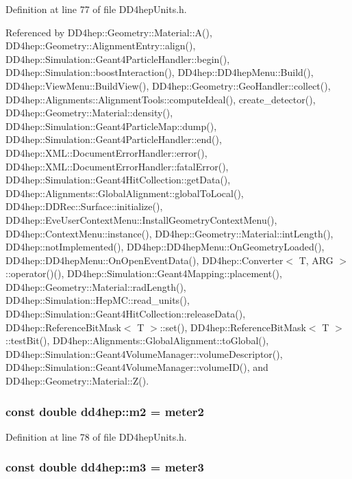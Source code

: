 Definition at line 77 of file DD4hepUnits.h.

Referenced by DD4hep::Geometry::Material::A(), DD4hep::Geometry::AlignmentEntry::align(), DD4hep::Simulation::Geant4ParticleHandler::begin(), DD4hep::Simulation::boostInteraction(), DD4hep::DD4hepMenu::Build(), DD4hep::ViewMenu::BuildView(), DD4hep::Geometry::GeoHandler::collect(), DD4hep::Alignments::AlignmentTools::computeIdeal(), create\_\-detector(), DD4hep::Geometry::Material::density(), DD4hep::Simulation::Geant4ParticleMap::dump(), DD4hep::Simulation::Geant4ParticleHandler::end(), DD4hep::XML::DocumentErrorHandler::error(), DD4hep::XML::DocumentErrorHandler::fatalError(), DD4hep::Simulation::Geant4HitCollection::getData(), DD4hep::Alignments::GlobalAlignment::globalToLocal(), DD4hep::DDRec::Surface::initialize(), DD4hep::EveUserContextMenu::InstallGeometryContextMenu(), DD4hep::ContextMenu::instance(), DD4hep::Geometry::Material::intLength(), DD4hep::notImplemented(), DD4hep::DD4hepMenu::OnGeometryLoaded(), DD4hep::DD4hepMenu::OnOpenEventData(), DD4hep::Converter$<$ T, ARG $>$::operator()(), DD4hep::Simulation::Geant4Mapping::placement(), DD4hep::Geometry::Material::radLength(), DD4hep::Simulation::HepMC::read\_\-units(), DD4hep::Simulation::Geant4HitCollection::releaseData(), DD4hep::ReferenceBitMask$<$ T $>$::set(), DD4hep::ReferenceBitMask$<$ T $>$::testBit(), DD4hep::Alignments::GlobalAlignment::toGlobal(), DD4hep::Simulation::Geant4VolumeManager::volumeDescriptor(), DD4hep::Simulation::Geant4VolumeManager::volumeID(), and DD4hep::Geometry::Material::Z().\hypertarget{namespacedd4hep_aea4ab60384218f15ec3ba53896735b6c}{
\subsubsection[{m2}]{\setlength{\rightskip}{0pt plus 5cm}const double {\bf dd4hep::m2} = {\bf meter2}}}
\label{namespacedd4hep_aea4ab60384218f15ec3ba53896735b6c}


Definition at line 78 of file DD4hepUnits.h.\hypertarget{namespacedd4hep_a9e16f264f9812fefbe417d510185205b}{
\subsubsection[{m3}]{\setlength{\rightskip}{0pt plus 5cm}const double {\bf dd4hep::m3} = {\bf meter3}}}
\label{namespacedd4hep_a9e16f264f9812fefbe417d510185205b}


